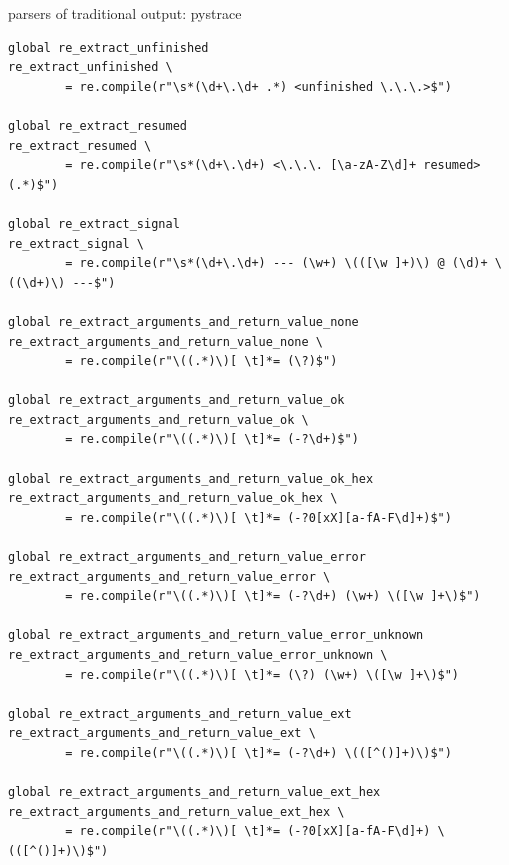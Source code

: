 \documentclass[pdf]{beamer}
\begin{document}
\begin{frame}[fragile]{parsers of traditional output: pystrace}
\begin{tiny}
\begin{verbatim}
global re_extract_unfinished
re_extract_unfinished \
		= re.compile(r"\s*(\d+\.\d+ .*) <unfinished \.\.\.>$")

global re_extract_resumed
re_extract_resumed \
		= re.compile(r"\s*(\d+\.\d+) <\.\.\. [\a-zA-Z\d]+ resumed>(.*)$")

global re_extract_signal
re_extract_signal \
		= re.compile(r"\s*(\d+\.\d+) --- (\w+) \(([\w ]+)\) @ (\d)+ \((\d+)\) ---$")

global re_extract_arguments_and_return_value_none
re_extract_arguments_and_return_value_none \
		= re.compile(r"\((.*)\)[ \t]*= (\?)$")

global re_extract_arguments_and_return_value_ok
re_extract_arguments_and_return_value_ok \
		= re.compile(r"\((.*)\)[ \t]*= (-?\d+)$")

global re_extract_arguments_and_return_value_ok_hex
re_extract_arguments_and_return_value_ok_hex \
		= re.compile(r"\((.*)\)[ \t]*= (-?0[xX][a-fA-F\d]+)$")

global re_extract_arguments_and_return_value_error
re_extract_arguments_and_return_value_error \
		= re.compile(r"\((.*)\)[ \t]*= (-?\d+) (\w+) \([\w ]+\)$")

global re_extract_arguments_and_return_value_error_unknown
re_extract_arguments_and_return_value_error_unknown \
		= re.compile(r"\((.*)\)[ \t]*= (\?) (\w+) \([\w ]+\)$")

global re_extract_arguments_and_return_value_ext
re_extract_arguments_and_return_value_ext \
		= re.compile(r"\((.*)\)[ \t]*= (-?\d+) \(([^()]+)\)$")

global re_extract_arguments_and_return_value_ext_hex
re_extract_arguments_and_return_value_ext_hex \
		= re.compile(r"\((.*)\)[ \t]*= (-?0[xX][a-fA-F\d]+) \(([^()]+)\)$")
\end{verbatim}
\end{tiny}
\end{frame}
\end{document}
